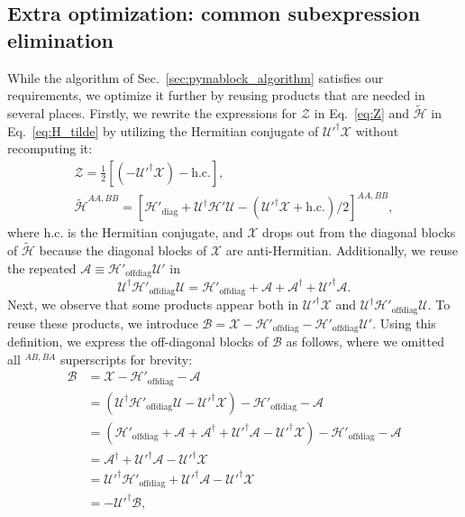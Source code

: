\subsection{Extra optimization: common subexpression elimination}
While the algorithm of Sec.~\ref{sec:pymablock_algorithm} satisfies our requirements, we optimize it further by reusing products that are needed in several places.
Firstly, we rewrite the expressions for $\mathcal{Z}$ in Eq.~\eqref{eq:Z} and $\tilde{\mathcal{H}}$ in Eq.~\eqref{eq:H_tilde} by utilizing the Hermitian conjugate of $\mathcal{U}'^\dagger \mathcal{X}$ without recomputing it:
%
\begin{gather*}
\mathcal{Z} = \frac{1}{2}\left[(-\mathcal{U}'^\dagger \mathcal{X})- \textrm{h.c.}\right],\\
\tilde{\mathcal{H}}^{AA,BB} = \left[\mathcal{H}'_\textrm{diag} + \mathcal{U}^\dagger \mathcal{H}' \mathcal{U} - (\mathcal{U}'^\dagger \mathcal{X} + \textrm{h.c.})/2\right]^{AA,BB},
\end{gather*}
%
where $\textrm{h.c.}$ is the Hermitian conjugate, and $\mathcal{X}$ drops out from the diagonal blocks of $\tilde{\mathcal{H}}$ because the diagonal blocks of $\mathcal{X}$ are anti-Hermitian.
%
Additionally, we reuse the repeated $\mathcal{A} \equiv \mathcal{H}'_\textrm{offdiag}\mathcal{U}'$
in
%
$$
\mathcal{U}^\dagger \mathcal{H}'_\textrm{offdiag} \mathcal{U} = \mathcal{H}'_\textrm{offdiag} + \mathcal{A} + \mathcal{A}^\dagger + \mathcal{U}'^\dagger \mathcal{A}.
$$
%
Next, we observe that some products appear both in $\mathcal{U}'^\dagger \mathcal{X}$ and $\mathcal{U}^\dagger \mathcal{H}'_\textrm{offdiag} \mathcal{U}$.
%
To reuse these products, we introduce $\mathcal{B} = \mathcal{X} - \mathcal{H}'_\textrm{offdiag} - \mathcal{H}'_\textrm{offdiag} \mathcal{U}'$.
%
Using this definition, we express the off-diagonal blocks of $\mathcal{B}$ as follows, where we omitted all $^{AB,BA}$ superscripts for brevity:
%
\begin{align*}
  \mathcal{B} &= \mathcal{X} - \mathcal{H}'_\textrm{offdiag} - \mathcal{A} \\
  &= (\mathcal{U}^\dagger \mathcal{H}'_\textrm{offdiag} \mathcal{U} - \mathcal{U}'^\dagger \mathcal{X}) - \mathcal{H}'_\textrm{offdiag} - \mathcal{A} \\
  &= (\mathcal{H}'_\textrm{offdiag} + \mathcal{A} + \mathcal{A}^\dagger + \mathcal{U}'^\dagger \mathcal{A} - \mathcal{U}'^\dagger \mathcal{X}) - \mathcal{H}'_\textrm{offdiag} - \mathcal{A} \\
  &= \mathcal{A}^\dagger + \mathcal{U}'^\dagger\mathcal{A} - \mathcal{U}'^\dagger \mathcal{X} \\
  &= \mathcal{U}'^\dagger\mathcal{H}'_\textrm{offdiag} + \mathcal{U}'^\dagger\mathcal{A} - \mathcal{U}'^\dagger \mathcal{X} \\
  &= -\mathcal{U'}^\dagger \mathcal{B},
\end{align*}
